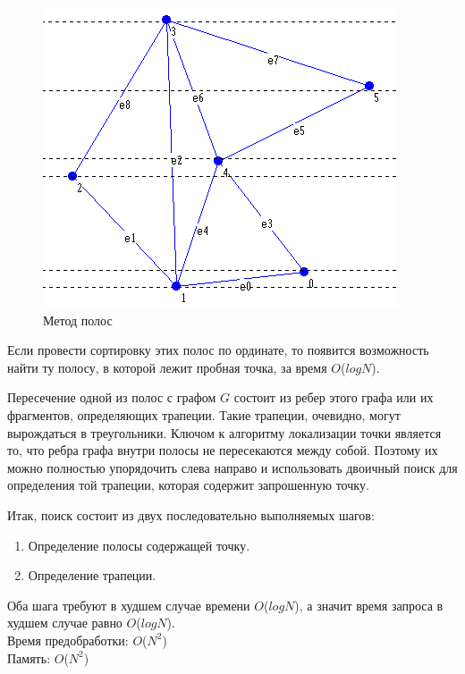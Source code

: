 \begin{figure}[H]
    \centering
    \includegraphics[width=0.6\linewidth]{polos.png}
    \caption{Метод полос}
\end{figure}

Если провести сортировку этих полос по ординате, то появится возможность найти ту полосу, в которой лежит пробная точка, за время $O$($logN$).

Пересечение одной из полос с графом $G$ состоит из ребер этого графа или их фрагментов, определяющих трапеции. Такие трапеции, очевидно, могут вырождаться в треугольники. Ключом к алгоритму локализации точки является то, что ребра графа внутри полосы не пересекаются между собой. Поэтому их можно полностью упорядочить слева направо и использовать двоичный поиск для определения той трапеции, которая содержит запрошенную точку.

Итак, поиск состоит из двух последовательно выполняемых шагов:
\begin{enumerate}
    \item Определение полосы содержащей точку.
    \item Определение трапеции.
\end{enumerate}

Оба шага требуют в худшем случае времени $O$($logN$), а значит время запроса в худшем случае равно $O$($logN$). \\
Время предобработки: $O$($N^2$) \\
Память: $O$($N^2$)

